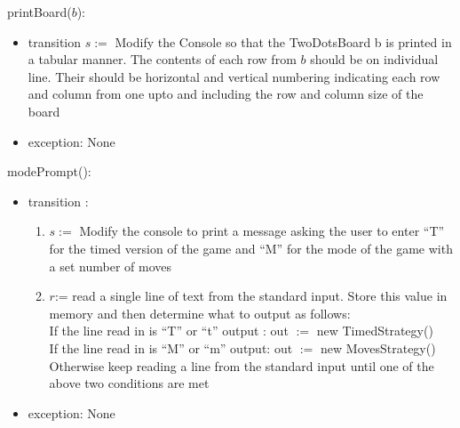 \documentclass[12pt]{article}
\begin{document}
\noindent printBoard($b$): 
\begin{itemize}
\item transition $s:=$ Modify the Console so that the TwoDotsBoard b is printed in a tabular manner. The contents of each row from $b$ should
be on individual line. Their should be horizontal and vertical numbering indicating each row and column from one upto and including the row and column size of the board
\item exception: None
\end{itemize}

\noindent modePrompt(): 
\begin{itemize}
\item transition :
\begin{enumerate}
\item $s:=$ Modify the console to print a message asking the user to enter ``T'' for the timed version of the game and ``M'' for the mode of the game with a set number of moves
\item $r$:= read a single line of text from the standard input. Store this value in memory and then determine what to output as follows:\\
If the line read in is ``T'' or ``t'' output : out $ := $ new TimedStrategy()\\
If the line read in is ``M'' or ``m'' output: out $ := $ new MovesStrategy()\\
Otherwise keep reading a line from the standard input until one of the above two conditions are met
\end{enumerate}
\item exception: None
\end{itemize}
\end{document}
